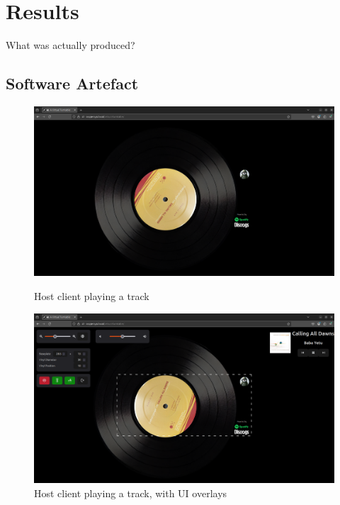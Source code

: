     \section{Results} %
        \begin{temp}
            What was actually produced?
        \end{temp}
        \subsection{Software Artefact}
    
            \begin{figure}[h]
                \centering
                \begin{minipage}[b]{0.45\textwidth}
                    \centering
                    \includegraphics[width=\textwidth]{images/screenshots/HOST_Quiet.png}
                    \caption{Host client playing a track}
                    \label{fig:hostQuiet}
                \end{minipage}
                \hfill
                \begin{minipage}[b]{0.45\textwidth}
                    \centering
                    \includegraphics[width=\textwidth]{images/screenshots/HOST_GUI.png}
                    \caption{Host client playing a track, with UI overlays}
                    \label{fig:hostGui}
                \end{minipage}
            \end{figure}
            

